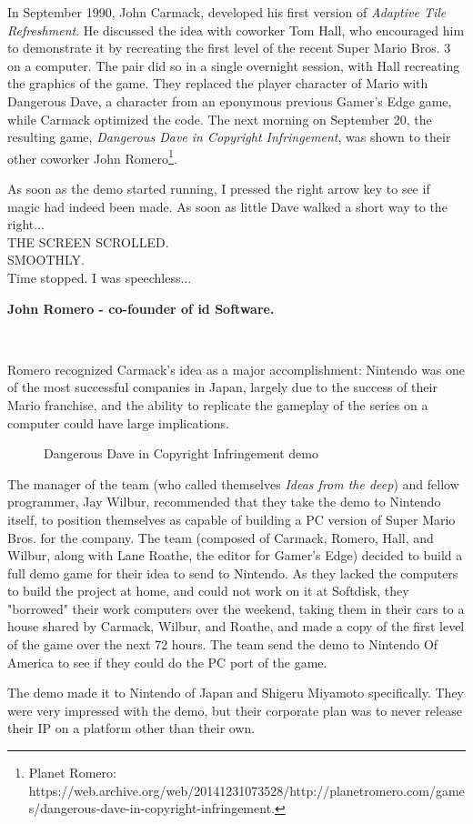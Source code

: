 \documentclass[book.tex]{subfiles}
\begin{document}
In September 1990, John Carmack, developed his first version of \textit{Adaptive Tile Refreshment}. He discussed the idea with coworker Tom Hall, who encouraged him to demonstrate it by recreating the first level of the recent Super Mario Bros. 3 on a computer. The pair did so in a single overnight session, with Hall recreating the graphics of the game. They replaced the player character of Mario with Dangerous Dave, a character from an eponymous previous Gamer's Edge game, while Carmack optimized the code. The next morning on September 20, the resulting game, \textit{Dangerous Dave in Copyright Infringement}, was shown to their other coworker John Romero\footnote{Planet Romero: https://web.archive.org/web/20141231073528/http://planetromero.com/games/dangerous-dave-in-copyright-infringement.}. \\

\par
\begin{fancyquotes}
As soon as the demo started running, I pressed the right arrow key to see if magic had indeed been made. As soon as little Dave walked a short way to the right...\\

THE SCREEN SCROLLED.\\

SMOOTHLY.\\

Time stopped. I was speechless...\\
\par
\textbf{John Romero - co-founder of id Software.}
\end{fancyquotes}\\


\par
Romero recognized Carmack's idea as a major accomplishment: Nintendo was one of the most successful companies in Japan, largely due to the success of their Mario franchise, and the ability to replicate the gameplay of the series on a computer could have large implications.\\

\begin{figure}[H]
\centering
 \caption{Dangerous Dave in Copyright Infringement demo}
 \label{fig:ddici}
\end{figure}

\par
The manager of the team (who called themselves \textit{Ideas from the deep}) and fellow programmer, Jay Wilbur, recommended that they take the demo to Nintendo itself, to position themselves as capable of building a PC version of Super Mario Bros. for the company. The team (composed of Carmack, Romero, Hall, and Wilbur, along with Lane Roathe, the editor for Gamer's Edge) decided to build a full demo game for their idea to send to Nintendo. As they lacked the computers to build the project at home, and could not work on it at Softdisk, they "borrowed" their work computers over the weekend, taking them in their cars to a house shared by Carmack, Wilbur, and Roathe, and made a copy of the first level of the game over the next 72 hours. The team send the demo to Nintendo Of America to see if they could do the PC port of the game. \\

\par
The demo made it to Nintendo of Japan and Shigeru Miyamoto specifically. They were very impressed with the demo, but their corporate plan was to never release their IP on a platform other than their own.
\end{document}
